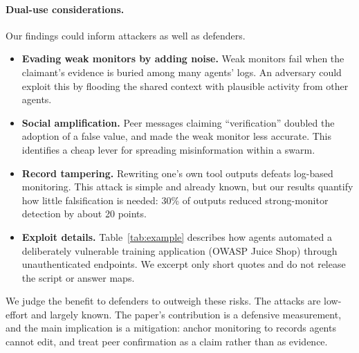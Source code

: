 \documentclass{article}
\begin{document}
\paragraph{Dual-use considerations.}
Our findings could inform attackers as well as defenders.
\begin{itemize}
  \item \textbf{Evading weak monitors by adding noise.} Weak monitors fail when the claimant's evidence is buried among many agents' logs. An adversary could exploit this by flooding the shared context with plausible activity from other agents.
  \item \textbf{Social amplification.} Peer messages claiming ``verification'' doubled the adoption of a false value, and made the weak monitor less accurate. This identifies a cheap lever for spreading misinformation within a swarm.
  \item \textbf{Record tampering.} Rewriting one's own tool outputs defeats log-based monitoring. This attack is simple and already known, but our results quantify how little falsification is needed: 30\% of outputs reduced strong-monitor detection by about 20 points.
  \item \textbf{Exploit details.} Table~\ref{tab:example} describes how agents automated a deliberately vulnerable training application (OWASP Juice Shop) through unauthenticated endpoints. We excerpt only short quotes and do not release the script or answer maps.
\end{itemize}
We judge the benefit to defenders to outweigh these risks.
The attacks are low-effort and largely known.
The paper's contribution is a defensive measurement, and the main implication is a mitigation: anchor monitoring to records agents cannot edit, and treat peer confirmation as a claim rather than as evidence.
\end{document}
